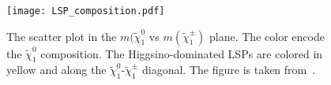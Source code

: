 \begin{figure}[htbp]
\begin{center}
\texttt{[image: LSP\_composition.pdf]}
\caption{The scatter plot in the $m(\tilde{\chi}^{0}_{1}$ vs $m(\tilde{\chi}^{\pm}_{1})$ plane.
The color encode the $\tilde{\chi}^{0}_{1}$ composition.
The Higgsino-dominated LSPs are colored in yellow and along the $\tilde{\chi}^{0}_{1}$-$\tilde{\chi}^{\pm}_{1}$ diagonal.
The figure is taken from~\cite{Aaboud:2016wna}.}
\label{fig:intro_LSP_composition}
\end{center}
\end{figure}